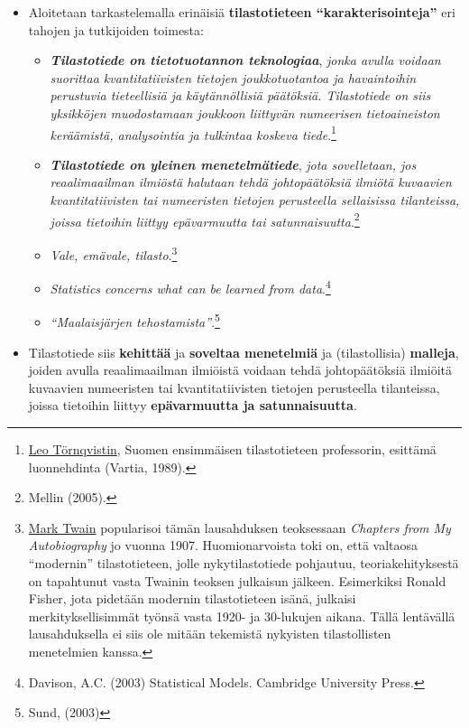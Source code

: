 \documentclass[
]{book}
\providecommand{\tightlist}{%
  \setlength{\itemsep}{0pt}\setlength{\parskip}{0pt}}
\begin{document}
\begin{itemize}
\tightlist
\item
  Aloitetaan tarkastelemalla erinäisiä \textbf{tilastotieteen ``karakterisointeja''} eri tahojen ja tutkijoiden toimesta:

  \begin{itemize}
  \tightlist
  \item
    \textbf{\emph{Tilastotiede on tietotuotannon teknologiaa}}, \emph{jonka avulla voidaan suorittaa kvantitatiivisten tietojen joukkotuotantoa ja havaintoihin perustuvia tieteellisiä ja käytännöllisiä päätöksiä. Tilastotiede on siis yksikköjen muodostamaan joukkoon liittyvän numeerisen tietoaineiston keräämistä, analysointia ja tulkintaa koskeva tiede}.\footnote{\href{https://fi.wikipedia.org/wiki/Leo_T\%C3\%B6rnqvist}{Leo Törnqvistin}, Suomen ensimmäisen tilastotieteen professorin, esittämä luonnehdinta (Vartia, 1989).}
  \item
    \textbf{\emph{Tilastotiede on yleinen menetelmätiede}}, \emph{jota sovelletaan, jos reaalimaailman ilmiöstä halutaan tehdä johtopäätöksiä ilmiötä kuvaavien kvantitatiivisten tai numeeristen tietojen perusteella sellaisissa tilanteissa, joissa tietoihin liittyy epävarmuutta tai satunnaisuutta}.\footnote{Mellin (2005).}
  \item
    \emph{Vale, emävale, tilasto}.\footnote{\href{https://fi.wikipedia.org/wiki/Mark_Twain}{Mark Twain} popularisoi tämän lausahduksen teoksessaan \emph{Chapters from My Autobiography} jo vuonna 1907. Huomionarvoista toki on, että valtaosa ``modernin'' tilastotieteen, jolle nykytilastotiede pohjautuu, teoriakehityksestä on tapahtunut vasta Twainin teoksen julkaisun jälkeen. Esimerkiksi Ronald Fisher, jota pidetään modernin tilastotieteen isänä, julkaisi merkityksellisimmät työnsä vasta 1920- ja 30-lukujen aikana. Tällä lentävällä lausahduksella ei siis ole mitään tekemistä nykyisten tilastollisten menetelmien kanssa.}
  \item
    \emph{Statistics concerns what can be learned from data}.\footnote{Davison, A.C. (2003) Statistical Models. Cambridge University Press.}
  \item
    \emph{``Maalaisjärjen tehostamista''}.\footnote{Sund, (2003)}
  \end{itemize}
\item
  Tilastotiede siis \textbf{kehittää} ja \textbf{soveltaa menetelmiä} ja (tilastollisia) \textbf{malleja}, joiden avulla reaalimaailman ilmiöistä voidaan tehdä johtopäätöksiä ilmiöitä kuvaavien numeeristen tai kvantitatiivisten tietojen perusteella tilanteissa, joissa tietoihin liittyy \textbf{epävarmuutta ja satunnaisuutta}.


\end{itemize}
\end{document}
